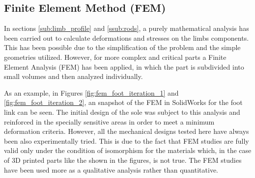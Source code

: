 
\subsection{Finite Element Method (FEM)} %
\label{sub:finite_element_method}
In sections \ref{sub:limb_profile} and \ref{ssub:rods}, a purely mathematical analysis has been carried out to calculate deformations and stresses on the limbs components.
This has been possible due to the simplification of the problem and the simple geometries utilized.
However, for more complex and critical parts a Finite Element Analysis (FEM) has been applied, in which the part is subdivided into small volumes and then analyzed individually.

As an example, in Figures \ref{fig:fem_foot_iteration_1} and \ref{fig:fem_foot_iteration_2}, an snapshot of the FEM in SolidWorks for the foot link can be seen.
The initial design of the sole was subject to this analysis and reinforced in the specially sensitive areas in order to meet a minimum deformation criteria.
However, all the mechanical designs tested here have always been also experimentally tried.
This is due to the fact that FEM studies are fully valid only under the condition of isomorphism for the materials which, in the case of 3D printed parts like the shown in the figures, is not true.
The FEM studies have been used more as a qualitative analysis rather than quantitative.

